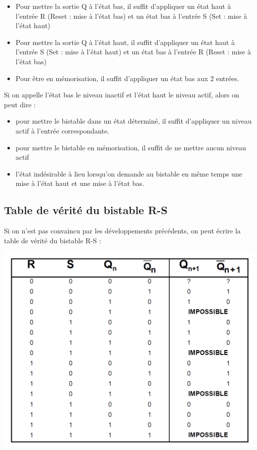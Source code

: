 \begin{itemize}
\item Pour mettre la sortie Q à l'état bas, il suffit d'appliquer un état haut à l'entrée R (Reset : mise à l'état bas)
et un état bas à l'entrée S (Set : mise à l'état haut)
\item Pour mettre la sortie Q à l'état haut, il suffit d'appliquer un état haut à l'entrée S (Set : mise à l'état haut)
et un état bas à l'entrée R (Reset : mise à l'état bas)
\item Pour être en mémorisation, il suffit d'appliquer un état bas aux 2 entrées.
\end{itemize}
\vspace{3mm}
Si on appelle l'état bas le niveau inactif et l'état haut le niveau actif, alors on peut dire :
\vspace{3mm}
\begin{itemize}
\item pour mettre le bistable dans un état déterminé, il suffit d'appliquer un niveau actif à l'entrée
correspondante.
\item pour mettre le bistable en mémorisation, il suffit de ne mettre aucun niveau actif
\item l'état indésirable à lieu lorsqu'on demande au bistable en même temps une mise à l'état haut et une mise à l'état bas.
\end{itemize}

\subsection{Table de vérité du bistable R-S}
Si on n'est pas convaincu par les développements précédents, on peut écrire la table de vérité du
bistable R-S :
\begin{center}
\includegraphics[scale=0.6]{Labo3_RS_tab1.png}
\end{center}

